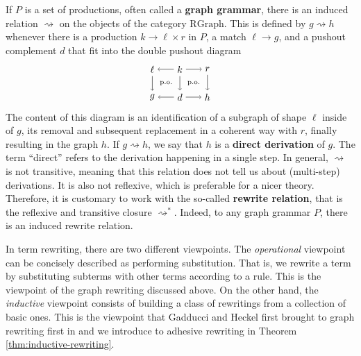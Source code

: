 \documentclass{amsart}
\newcommand{\RGraph}{\cat{RGraph}}
\newcommand{\defn}[1]{\textbf{#1}}
\newcommand{\cat}[1]{\mathrm{#1}}
\newcommand{\dderiv}[2]{#1 \rightsquigarrow #2}
\newcommand{\deriv}[2]{#1 \rightsquigarrow^\ast #2}
\newcommand{\spn}[3]{#2 \to #1 \times #3}
\theoremstyle{remark}
\theoremstyle{definition}
\begin{document}
If $ P $ is a set of productions, often called a \defn{graph grammar},
there is an induced relation $ \dderiv{}{} $ on the objects of the
category $ \RGraph $. This is defined by $ \dderiv{g}{h} $ whenever
there is a production $ \spn{\ell}{k}{r} $ in $ P $, a match
$ \ell \to g $, and a pushout complement $ d $ that fit into the
double pushout diagram
%
\[
  \begin{tikzpicture}
    \node (1) at (0,1) {$ \ell $};
    \node (2) at (1,1) {$ k $};
    \node (3) at (2,1) {$ r $};
    \node (4) at (0,0) {$ g $};
    \node (5) at (1,0) {$ d $};
    \node (6) at (2,0) {$ h $};
    \draw [->] (2) to node [] {\scriptsize{$  $}} (1);
    \draw [->] (2) to node [] {\scriptsize{$  $}} (3);
    \draw [->] (5) to node [] {\scriptsize{$  $}} (4);
    \draw [->] (5) to node [] {\scriptsize{$  $}} (6);
    \draw [->] (1) to node [] {\scriptsize{$  $}} (4);
    \draw [->] (2) to node [] {\scriptsize{$  $}} (5);
    \draw [->] (3) to node [] {\scriptsize{$  $}} (6);
    \node () at (0.5,0.5) {\scriptsize{p.o.}};
    \node () at (1.5,0.5) {\scriptsize{p.o.}};
  \end{tikzpicture}
\]
%
The content of this diagram is an identification of a subgraph of
shape $ \ell $ inside of $ g $, its removal and subsequent replacement
in a coherent way with $ r $, finally resulting in the graph $ h $. If
$ \dderiv{g}{h} $, we say that $ h $ is a \defn{direct derivation} of
$ g $. The term ``direct'' refers to the derivation happening in a
single step.  In general, $ \dderiv{}{} $ is not transitive, meaning
that this relation does not tell us about (multi-step) derivations. It
is also not reflexive, which is preferable for a nicer theory.
Therefore, it is customary to work with the so-called \defn{rewrite
  relation}, that is the reflexive and transitive closure
$ \deriv{}{} $. Indeed, to any graph grammar $ P $, there is an
induced rewrite relation.

In term rewriting, there are two different viewpoints. The
\emph{operational} viewpoint can be concisely described as performing
substitution. That is, we rewrite a term by substituting subterms with
other terms according to a rule. This is the viewpoint of the graph
rewriting discussed above.  On the other hand, the \emph{inductive}
viewpoint consists of building a class of rewritings from a collection
of basic ones.  This is the viewpoint that Gadducci and Heckel first
brought to graph rewriting first in \cite{Gadd_IndGraphTrans}
and we introduce to adhesive rewriting in Theorem \ref{thm:inductive-rewriting}.
\end{document}

